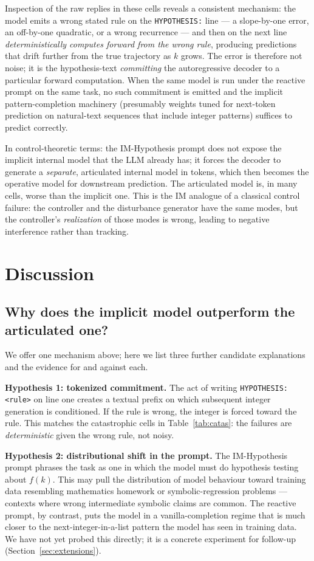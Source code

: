 \documentclass[11pt]{article}
\begin{document}
Inspection of the raw replies in these cells reveals a consistent
mechanism: the model emits a wrong stated rule on the
\verb|HYPOTHESIS:| line --- a slope-by-one error, an off-by-one
quadratic, or a wrong recurrence --- and then on the next line
\emph{deterministically computes forward from the wrong rule},
producing predictions that drift further from the true
trajectory as $k$ grows.  The error is therefore not noise; it is
the hypothesis-text \emph{committing} the autoregressive decoder
to a particular forward computation.  When the same model is run
under the reactive prompt on the same task, no such commitment is
emitted and the implicit pattern-completion machinery (presumably
weights tuned for next-token prediction on natural-text sequences
that include integer patterns) suffices to predict correctly.

In control-theoretic terms: the IM-Hypothesis prompt does not
expose the implicit internal model that the LLM already has; it
forces the decoder to generate a \emph{separate}, articulated
internal model in tokens, which then becomes the operative model
for downstream prediction.  The articulated model is, in many
cells, worse than the implicit one.  This is the IM analogue of a
classical control failure: the controller and the disturbance
generator have the same modes, but the controller's
\emph{realization} of those modes is wrong, leading to negative
interference rather than tracking.

\section{Discussion}
\label{sec:discussion}

\subsection{Why does the implicit model outperform the articulated one?}

We offer one mechanism above; here we list three further candidate
explanations and the evidence for and against each.

\textbf{Hypothesis 1: tokenized commitment.}  The act of writing
\verb|HYPOTHESIS: <rule>| on line one creates a textual prefix on
which subsequent integer generation is conditioned.  If the rule
is wrong, the integer is forced toward the rule.  This matches
the catastrophic cells in Table~\ref{tab:catas}: the failures are
\emph{deterministic} given the wrong rule, not noisy.

\textbf{Hypothesis 2: distributional shift in the prompt.}  The
IM-Hypothesis prompt phrases the task as one in which the model
must do hypothesis testing about $f(k)$.  This may pull the
distribution of model behaviour toward training data resembling
mathematics homework or symbolic-regression problems --- contexts
where wrong intermediate symbolic claims are common.  The reactive
prompt, by contrast, puts the model in a vanilla-completion
regime that is much closer to the next-integer-in-a-list pattern
the model has seen in training data.  We have not yet probed this
directly; it is a concrete experiment for follow-up
(Section~\ref{sec:extensions}).
\end{document}
